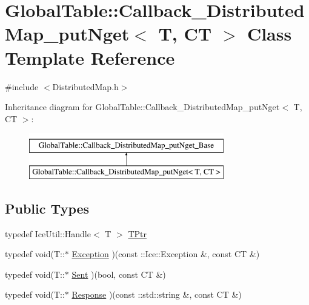 \hypertarget{class_global_table_1_1_callback___distributed_map__put_nget}{
\section{GlobalTable::Callback\_\-DistributedMap\_\-putNget$<$ T, CT $>$ Class Template Reference}
\label{class_global_table_1_1_callback___distributed_map__put_nget}
}


{\ttfamily \#include $<$DistributedMap.h$>$}

Inheritance diagram for GlobalTable::Callback\_\-DistributedMap\_\-putNget$<$ T, CT $>$:\begin{figure}[H]
\begin{center}
\leavevmode
\includegraphics[height=2cm]{class_global_table_1_1_callback___distributed_map__put_nget}
\end{center}
\end{figure}
\subsection*{Public Types}
\begin{DoxyCompactItemize}
\item 
typedef IceUtil::Handle$<$ T $>$ \hyperlink{class_global_table_1_1_callback___distributed_map__put_nget_a037a94498b05c6b5fc70ba285bc371d3}{TPtr}
\item 
typedef void(T::$\ast$ \hyperlink{class_global_table_1_1_callback___distributed_map__put_nget_a48bbaf406f2d2808978aae28a5d97fec}{Exception} )(const ::Ice::Exception \&, const CT \&)
\item 
typedef void(T::$\ast$ \hyperlink{class_global_table_1_1_callback___distributed_map__put_nget_a66e1df0479df703206b863c898f0d9dd}{Sent} )(bool, const CT \&)
\item 
typedef void(T::$\ast$ \hyperlink{class_global_table_1_1_callback___distributed_map__put_nget_a2cc52cb4955940f3e037371ca7cb6b08}{Response} )(const ::std::string \&, const CT \&)
\end{DoxyCompactItemize}
